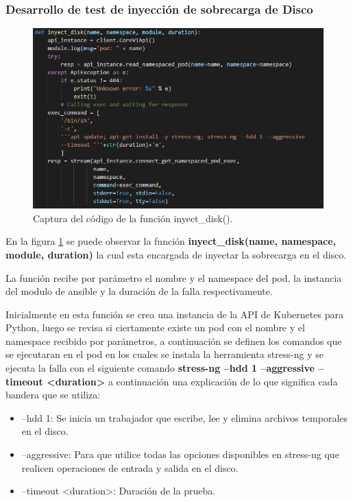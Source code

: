 \subsubsection{Desarrollo de test de inyección de sobrecarga de Disco}

\begin{figure}[htpb!]
	\centering
	\includegraphics[width=0.95\columnwidth]{images/captures/codigo/Capture_inyect_disk.PNG}
	\caption{Captura del código de la función inyect\_disk().}
	\label{fig:codi05}
\end{figure}

\par En la figura \ref{fig:codi05} se puede observar la función \textbf{ inyect\_disk(name, namespace, module, duration)} la cual esta encargada de inyectar la sobrecarga en el disco.\\


\par La función recibe por parámetro el nombre y el namespace del pod, la instancia del modulo de ansible y la duración de la falla respectivamente. \\
\par Inicialmente en esta función se crea una instancia de la API de Kubernetes para Python, luego se revisa si ciertamente existe un pod con el nombre y el namespace recibido por parámetros, a continuación se definen los comandos que se ejecutaran en el pod en los cuales se instala la herramienta stress-ng y se ejecuta la falla con el siguiente comando
\textbf{stress-ng --hdd 1 --aggressive --timeout <duration> } a continuación una explicación de lo que significa cada bandera que se utiliza:
\begin{itemize}
        \item --hdd 1: Se inicia un trabajador que escribe, lee y elimina archivos temporales en el disco.        
        \item --aggressive: Para que utilice todas las opciones disponibles en stress-ng que realicen operaciones de entrada y salida en el disco.
        \item --timeout <duration>: Duración de la prueba.\\
    \end{itemize}

